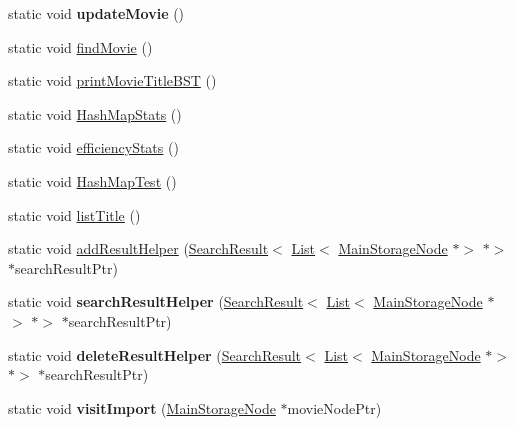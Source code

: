 \begin{DoxyCompactItemize}
static void {\bfseries update\+Movie} ()
\item 
static void \hyperlink{class_command_line_u_i_ae65ad2e8c5172594370fbeea8c5f825d}{find\+Movie} ()
\item 
static void \hyperlink{class_command_line_u_i_a7fcf3ac06e9e8124d8437a88defa48b6}{print\+Movie\+Title\+B\+ST} ()
\item 
static void \hyperlink{class_command_line_u_i_af57bcb2a7cb037743b1a936f308f2c85}{Hash\+Map\+Stats} ()
\item 
static void \hyperlink{class_command_line_u_i_a2c75c2a87bdf09d8c29decab9fd27ab2}{efficiency\+Stats} ()
\item 
static void \hyperlink{class_command_line_u_i_a1264261d9d777d3f76451cf6e69dc3fb}{Hash\+Map\+Test} ()
\item 
static void \hyperlink{class_command_line_u_i_ab47e2ef9d21338ad81a257cebb34b969}{list\+Title} ()
\item 
static void \hyperlink{class_command_line_u_i_adb828755a84f2e3209791f96eabd1bfa}{add\+Result\+Helper} (\hyperlink{class_search_result}{Search\+Result}$<$ \hyperlink{class_list}{List}$<$ \hyperlink{class_main_storage_node}{Main\+Storage\+Node} $\ast$$>$ $\ast$$>$ $\ast$search\+Result\+Ptr)
\item 
\mbox{\label{class_command_line_u_i_ab234b40ea16a60658c1558b5e43eedf3}} 
static void {\bfseries search\+Result\+Helper} (\hyperlink{class_search_result}{Search\+Result}$<$ \hyperlink{class_list}{List}$<$ \hyperlink{class_main_storage_node}{Main\+Storage\+Node} $\ast$$>$ $\ast$$>$ $\ast$search\+Result\+Ptr)
\item 
\mbox{\label{class_command_line_u_i_ac1add70263468277eaed54f26512b0d9}} 
static void {\bfseries delete\+Result\+Helper} (\hyperlink{class_search_result}{Search\+Result}$<$ \hyperlink{class_list}{List}$<$ \hyperlink{class_main_storage_node}{Main\+Storage\+Node} $\ast$$>$ $\ast$$>$ $\ast$search\+Result\+Ptr)
\item 
\mbox{\label{class_command_line_u_i_aadff7a118162e1366fb5ca2e8c0207e7}} 
static void {\bfseries visit\+Import} (\hyperlink{class_main_storage_node}{Main\+Storage\+Node} $\ast$movie\+Node\+Ptr)
\item 
\mbox{\label{class_command_line_u_i_aa8b7b5016fc6c499a55ab6cdbe66c38a}} 

\end{DoxyCompactItemize}

